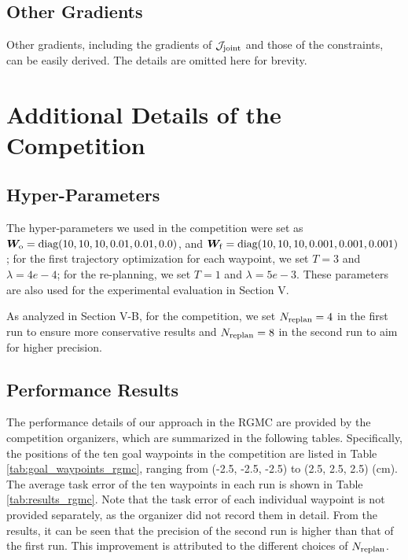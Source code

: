 {\subsection{Other Gradients}
Other gradients, including the gradients of $\mathcal{J}_{\rm joint}$ and those of the constraints, can be easily derived. The details are omitted here for brevity.

\section{Additional Details of the Competition}

\subsection{Hyper-Parameters}

The hyper-parameters we used in the competition were set as $\bm W_{\rm o} = \text{diag}(10, 10, 10, 0.01, 0.01, 0.0)$, and $\bm W_{\rm f} = \text{diag}(10, 10, 10, 0.001, 0.001, 0.001)$;
for the first trajectory optimization for each waypoint, we set $T=3$ and $\lambda = 4e-4$; 
for the re-planning, we set $T=1$ and $\lambda = 5e-3$. 
These parameters are also used for the experimental evaluation in Section V.

As analyzed in Section V-B, for the competition, we set $N_{\rm replan} = 4$ in the first run to ensure more conservative results and $N_{\rm replan} = 8$ in the second run to aim for higher precision.

\subsection{Performance Results}

The performance details of our approach in the RGMC are provided by the competition organizers, which are summarized in the following tables.
Specifically, the positions of the ten goal waypoints in the competition are listed in Table \ref{tab:goal_waypoints_rgmc}, ranging from (-2.5, -2.5, -2.5) to (2.5, 2.5, 2.5) (cm).
The average task error of the ten waypoints in each run is shown in Table \ref{tab:results_rgmc}. Note that the task error of each individual waypoint is not provided separately, as the organizer did not record them in detail. 
From the results, it can be seen that the precision of the second run is higher than that of the first run. This improvement is attributed to the different choices of $N_{\rm replan}$.

}
